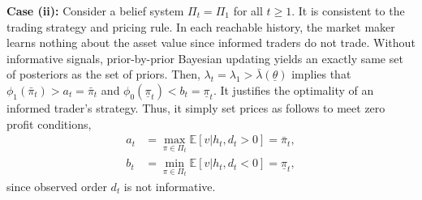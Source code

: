 \documentclass[12pt,a4paper]{article}
\newenvironment{original}{%
  \par\vspace{4pt}\noindent%
  \color{black}%
  \ignorespaces
}{%
  \par\vspace{2pt}%
}
\begin{document}
\begin{original}
\textbf{Case (ii):} Consider a belief system $\Pi_t = \Pi_1$ for all $t \geq 1$. It is consistent to the trading strategy and pricing rule. In each reachable history, the market maker learns nothing about the asset value since informed traders do not trade. Without informative signals, prior-by-prior Bayesian updating yields an exactly same set of posteriors as the set of priors. Then, $\lambda_t = \lambda_1 > \bar{\lambda}(\underline{\theta})$ implies that $\phi_1(\bar{\pi}_t) > a_t = \bar{\pi}_t$ and $\phi_0(\underline{\pi}_t) < b_t = \underline{\pi}_t$. It justifies the optimality of an informed trader's strategy. Thus, it simply set prices as follows to meet zero profit conditions,
\begin{align*}
a_t &= \max_{\pi\in\Pi_t} \mathbb{E}[v|h_t, d_t > 0] = \bar{\pi}_t,\\
b_t &= \min_{\pi\in\Pi_t} \mathbb{E}[v|h_t, d_t < 0] = \underline{\pi}_t,
\end{align*}
since observed order $d_t$ is not informative.
\end{original}
\end{document}
